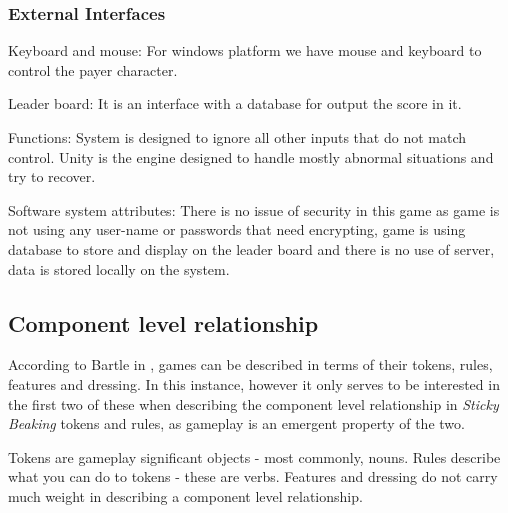 \documentclass[12pt]{article}
\newcommand{\game}[2]{\textit{#1}}{}
\begin{document}
\subsubsection{External Interfaces}
Keyboard and mouse: For windows platform we have mouse and keyboard to control the payer character.

Leader board: It is an interface with a database for output the score in it.

Functions: System is designed to ignore all other inputs that do not match control. Unity is the engine designed to handle mostly abnormal situations and try to recover.

Software system attributes: There is no issue of security in this game as game is not using any user-name or passwords that need encrypting, game is using database to store and display on the leader board and there is no use of server, data is stored locally on the system.

\subsection{Component level relationship}

According to Bartle in \cite{funandgameplay}, games can be described in terms of their tokens, rules, features and dressing. In this instance, however it only serves to be interested in the first two of these when describing the component level relationship in \game{Sticky Beaking}; tokens and rules, as gameplay is an emergent property of the two.

Tokens are gameplay significant objects - most commonly, nouns. Rules describe what you can do to tokens - these are verbs. Features and dressing do not carry much weight in describing a component level relationship.
\end{document}
